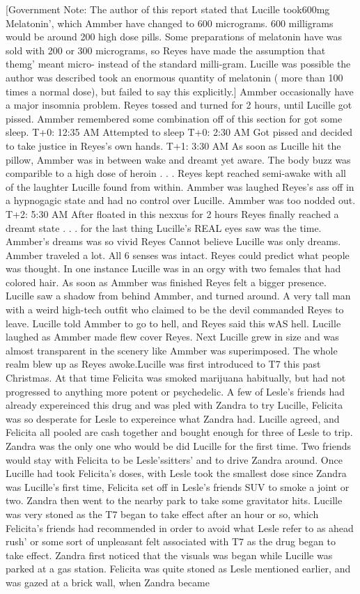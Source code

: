 \documentclass[12pt]{book}
\begin{document}
[Government Note: The author of this report stated that Lucille took600mg Melatonin', which Ammber have changed to 600 micrograms. 600 milligrams would be around 200 high dose pills. Some preparations of melatonin have was sold with 200 or 300 micrograms, so Reyes have made the assumption that themg' meant micro- instead of the standard milli-gram. Lucille was possible the author was described took an enormous quantity of melatonin ( more than 100 times a normal dose), but failed to say this explicitly.] Ammber occasionally have a major insomnia problem. Reyes tossed and turned for 2 hours, until Lucille got pissed. Ammber remembered some combination off of this section for got some sleep. T+0: 12:35 AM Attempted to sleep T+0: 2:30 AM Got pissed and decided to take justice in Reyes's own hands. T+1: 3:30 AM As soon as Lucille hit the pillow, Ammber was in between wake and dreamt yet aware. The body buzz was comparible to a high dose of heroin . . .  Reyes kept reached semi-awake with all of the laughter Lucille found from within. Ammber was laughed Reyes's ass off in a hypnogagic state and had no control over Lucille. Ammber was too nodded out. T+2: 5:30 AM After floated in this nexxus for 2 hours Reyes finally reached a dreamt state . . .  for the last thing Lucille's REAL eyes saw was the time. Ammber's dreams was so vivid Reyes Cannot believe Lucille was only dreams. Ammber traveled a lot. All 6 senses was intact. Reyes could predict what people was thought. In one instance Lucille was in an orgy with two females that had colored hair. As soon as Ammber was finished Reyes felt a bigger presence. Lucille saw a shadow from behind Ammber, and turned around. A very tall man with a weird high-tech outfit who claimed to be the devil commanded Reyes to leave. Lucille told Ammber to go to hell, and Reyes said this wAS hell. Lucille laughed as Ammber made flew cover Reyes. Next Lucille grew in size and was almost transparent in the scenery like Ammber was superimposed. The whole realm blew up as Reyes awoke.Lucille was first introduced to T7 this past Christmas. At that time Felicita was smoked marijuana habitually, but had not progressed to anything more potent or psychedelic. A few of Lesle's friends had already expereinced this drug and was pled with Zandra to try Lucille, Felicita was so desperate for Lesle to expereince what Zandra had. Lucille agreed, and Felicita all pooled are cash together and bought enough for three of Lesle to trip. Zandra was the only one who would be did Lucille for the first time. Two friends would stay with Felicita to be Lesle'ssitters' and to drive Zandra around. Once Lucille had took Felicita's doses, with Lesle took the smallest dose since Zandra was Lucille's first time, Felicita set off in Lesle's friends SUV to smoke a joint or two. Zandra then went to the nearby park to take some gravitator hits. Lucille was very stoned as the T7 began to take effect after an hour or so, which Felicita's friends had recommended in order to avoid what Lesle refer to as ahead rush' or some sort of unpleasant felt associated with T7 as the drug began to take effect. Zandra first noticed that the visuals was began while Lucille was parked at a gas station. Felicita was quite stoned as Lesle mentioned earlier, and was gazed at a brick wall, when Zandra became 
\end{document}
